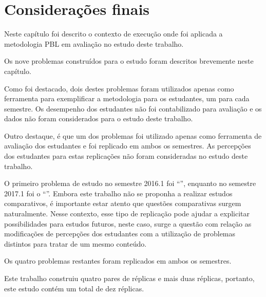 \section{Considerações finais}
\label{sec-consideracoes-estudo}
Neste capítulo foi descrito o contexto de execução onde foi aplicada a
metodologia PBL em avaliação no estudo deste trabalho.

Os nove problemas construídos para o estudo foram descritos brevemente neste capítulo.

Como foi destacado, dois destes problemas foram utilizados
apenas como ferramenta para exemplificar a metodologia para os estudantes,
um para cada semestre.
Os desempenho dos estudantes não foi contabilizado para avaliação
e os dados não foram considerados para o estudo deste trabalho.

Outro destaque, é que um dos problemas foi utilizado apenas como ferramenta
de avaliação dos estudantes e foi replicado em ambos os semestres.
As percepções dos estudantes para estas replicações não foram
consideradas no estudo deste trabalho.

O primeiro problema de estudo no semestre 2016.1 foi ``\ProblemaA'', enquanto no
semestre 2017.1 foi o ``\ProblemaG''.
Embora este trabalho não se proponha a realizar estudos comparativos, é importante
estar atento que questões comparativas surgem naturalmente.
Nesse contexto, esse tipo de replicação pode ajudar a explicitar possibilidades para
estudos futuros, neste caso, surge a questão com relação as modificações de
percepções dos estudantes com a utilização de problemas distintos
para tratar de um mesmo conteúdo.

Os quatro problemas restantes foram replicados em ambos os semestres.

Este trabalho construiu quatro pares de réplicas e mais duas
réplicas, portanto, este estudo contém um total de dez
réplicas.
